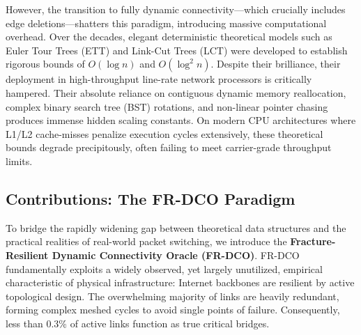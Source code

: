 \documentclass[runningheads]{llncs}
\begin{document}
However, the transition to fully dynamic connectivity—which crucially includes edge deletions—shatters this paradigm, introducing massive computational overhead. Over the decades, elegant deterministic theoretical models such as Euler Tour Trees (ETT) and Link-Cut Trees (LCT) \cite{ref2} were developed to establish rigorous bounds of $O(\log n)$ and $O(\log^2 n)$. Despite their brilliance, their deployment in high-throughput line-rate network processors is critically hampered. Their absolute reliance on contiguous dynamic memory reallocation, complex binary search tree (BST) rotations, and non-linear pointer chasing produces immense hidden scaling constants. On modern CPU architectures where L1/L2 cache-misses penalize execution cycles extensively, these theoretical bounds degrade precipitously, often failing to meet carrier-grade throughput limits.

\subsection{Contributions: The FR-DCO Paradigm}
To bridge the rapidly widening gap between theoretical data structures and the practical realities of real-world packet switching, we introduce the \textbf{Fracture-Resilient Dynamic Connectivity Oracle (FR-DCO)}. FR-DCO fundamentally exploits a widely observed, yet largely unutilized, empirical characteristic of physical infrastructure: Internet backbones are resilient by active topological design. The overwhelming majority of links are heavily redundant, forming complex meshed cycles to avoid single points of failure. Consequently, less than 0.3\% of active links function as true critical bridges.
\end{document}
